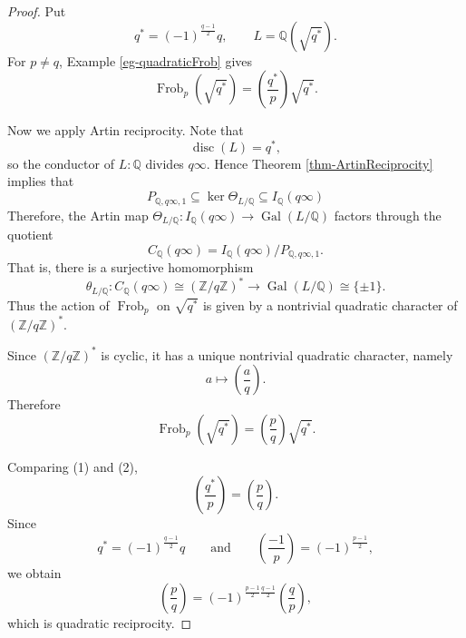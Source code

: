 \begin{proof}
Put
\[
q^*=(-1)^{\frac{q-1}{2}}q,
\qquad
L=\mathbb Q(\sqrt{q^*}).
\]
For $p\neq q$, Example \ref{eg-quadraticFrob} gives
\[
\operatorname{Frob}_p(\sqrt{q^*})
=
\left(\frac{q^*}{p}\right)\sqrt{q^*}.
\tag{1}
\]

Now we apply Artin reciprocity. Note that
\[
\operatorname{disc}(L)=q^*,
\]
so the conductor of $L:\mathbb Q$ divides $q\infty$. Hence
Theorem \ref{thm-ArtinReciprocity} implies that
\[
P_{\mathbb Q,q\infty,1}
\subseteq
\ker\Theta_{L/\mathbb Q} \subseteq I_{\mathbb Q}(q\infty)
\]
Therefore, the Artin map
\(
\Theta_{L/\mathbb Q}:
I_{\mathbb Q}(q\infty)
\longrightarrow
\operatorname{Gal}(L/\mathbb Q)
\)
factors through the quotient
\[
C_{\mathbb Q}(q\infty)
=
I_{\mathbb Q}(q\infty)/P_{\mathbb Q,q\infty,1}.
\]
That is, there is a surjective homomorphism
\[
\theta_{L/\mathbb Q}:
C_{\mathbb Q}(q\infty)\cong(\mathbb Z/q\mathbb Z)^*
\longrightarrow
\operatorname{Gal}(L/\mathbb Q) \cong \{\pm 1\}.
\]
Thus the action of $\operatorname{Frob}_p$ on $\sqrt{q^*}$ is given by a
nontrivial quadratic character of $(\mathbb Z/q\mathbb Z)^*$.

Since $(\mathbb Z/q\mathbb Z)^*$ is cyclic, it has a unique nontrivial
quadratic character, namely
\[
a\longmapsto\left(\frac aq\right).
\]
Therefore
\[
\operatorname{Frob}_p(\sqrt{q^*})
=
\left(\frac pq\right)\sqrt{q^*}.
\tag{2}
\]

Comparing (1) and (2),
\[
\left(\frac{q^*}{p}\right)=\left(\frac pq\right).
\]
Since
\[
q^*=(-1)^{\frac{q-1}{2}}q
\qquad\text{and}\qquad
\left(\frac{-1}{p}\right)=(-1)^{\frac{p-1}{2}},
\]
we obtain
\[
\left(\frac pq\right)
=
(-1)^{\frac{p-1}{2}\frac{q-1}{2}}
\left(\frac qp\right),
\]
which is quadratic reciprocity.
\end{proof}
